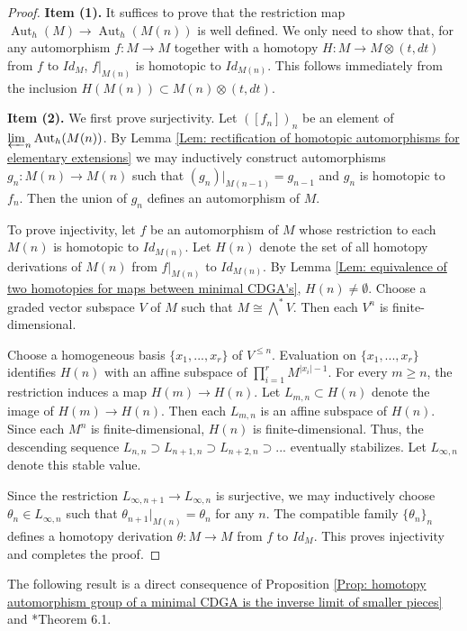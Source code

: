\documentclass[11pt]{amsart}
\theoremstyle{definition}
\numberwithin{equation}{section}
\numberwithin{equation}{section}
\DeclareMathOperator{\Aut}{Aut}
\begin{document}
\begin{proof}
\textbf{Item (1).} It suffices to prove that the restriction map $\Aut_h(M)\rightarrow \Aut_h(M(n))$ is well defined. We only need to show that, for any automorphism $f:M\rightarrow M$ together with a homotopy $H:M\rightarrow M\otimes (t,dt)$ from $f$ to $Id_M$, $f\vert_{M(n)}$ is homotopic to $Id_{M(n)}$. This follows immediately from the inclusion $H(M(n))\subset M(n)\otimes (t,dt)$.

\textbf{Item (2).} We first prove surjectivity. Let $([f_n])_n$ be an element of $\varprojlim_n \Aut_h(M(n))$. By Lemma \ref{Lem: rectification of homotopic automorphisms for elementary extensions} we may inductively construct automorphisms $g_n:M(n)\rightarrow M(n)$ such that $(g_n)\vert_{M(n-1)}=g_{n-1}$ and $g_{n}$ is homotopic to $f_n$. Then the union of $g_n$ defines an automorphism of $M$.

To prove injectivity, let $f$ be an automorphism of $M$ whose restriction to each $M(n)$ is homotopic to $Id_{M(n)}$. Let $H(n)$ denote the set of all homotopy derivations of $M(n)$ from $f\vert_{M(n)}$ to $Id_{M(n)}$. By Lemma \ref{Lem: equivalence of two homotopies for maps between minimal CDGA's}, $H(n)\neq \emptyset$. Choose a graded vector subspace $V$ of $M$ such that $M\cong \bigwedge^* V$. Then each $V^n$ is finite-dimensional. 

Choose a homogeneous basis $\{x_1,...,x_r\}$ of $V^{\leq n}$. Evaluation on $\{x_1,...,x_r\}$ identifies $H(n)$ with an affine subspace of $\prod_{i=1}^r M^{|x_i|-1}$. For every $m\geq n$, the restriction induces a map $H(m)\rightarrow H(n)$. Let $L_{m,n}\subset H(n)$ denote the image of $H(m)\rightarrow H(n)$. Then each $L_{m,n}$ is an affine subspace of $H(n)$. Since each $M^n$ is finite-dimensional, $H(n)$ is finite-dimensional. Thus, the descending sequence $L_{n,n}\supset L_{n+1,n}\supset L_{n+2,n} \supset...$ eventually stabilizes. Let $L_{\infty,n}$ denote this stable value.

Since the restriction $L_{\infty,n+1}\rightarrow L_{\infty,n}$ is surjective, we may inductively choose $\theta_n\in L_{\infty,n}$ such that $\theta_{n+1}\vert_{M(n)}=\theta_n$ for any $n$. The compatible family $\{\theta_n\}_n$ defines a homotopy derivation $\theta:M\rightarrow M$ from $f$ to $Id_{M}$. This proves injectivity and completes the proof.
\end{proof}

The following result is a direct consequence of Proposition \ref{Prop: homotopy automorphism group of a minimal CDGA is the inverse limit of smaller pieces} and \cite{Sullivan-rational-homotopy}*{Theorem 6.1}.
\end{document}
